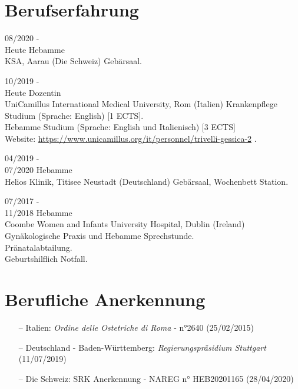 \documentclass[11pt]{friggeri-cv}
\begin{document}
\vspace{-10pt}
\section{Berufserfahrung}
\begin{entrylist}
  \entry
  {08/2020 -\\Heute}
  {Hebamme}
  {\\KSA, Aarau (Die Schweiz)}
  {Geb\"{a}rsaal.}
  
  \entry
  {10/2019 -\\Heute}
  {Dozentin}
  {\\UniCamillus International Medical University, Rom (Italien)}
  {
    Krankenpflege Studium (Sprache: English) [1 ECTS].\\
    Hebamme Studium (Sprache: English und Italienisch) [3 ECTS] \\
    Website:
    \footnotesize{\url{https://www.unicamillus.org/it/personnel/trivelli-gessica-2}} .
  }

  \entry
  {04/2019 -\\07/2020}
  {Hebamme}
  {\\Helios Klinik, Titisee Neustadt (Deutschland)}
  {Geb\"{a}rsaal, Wochenbett Station.}

  \entry
  {07/2017 -\\11/2018}
  {Hebamme}
  {\\Coombe Women and Infants University Hospital, Dublin (Ireland)}
  {
    Gyn\"{a}kologische Praxis und Hebamme Sprechstunde.\\
    Pr\"{a}natalabtailung.\\
    Geburtshilflich Notfall.
  }
\end{entrylist}


\vspace{10pt}
\section{Berufliche Anerkennung}
\begin{itemize}
  \item[--] Italien: \emph{Ordine delle Ostetriche di Roma} - n°2640 (25/02/2015)
  \item[--] Deutschland - Baden-W\"{u}rttemberg: \emph{Regierungspr\"{a}sidium Stuttgart} (11/07/2019)
  \item[--] Die Schweiz: SRK Anerkennung - NAREG n° HEB20201165 (28/04/2020)
\end{itemize}
\end{document}
